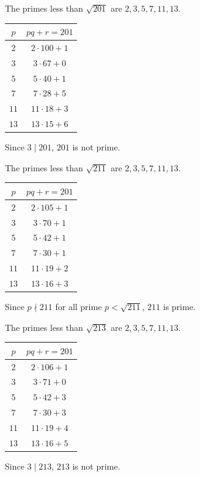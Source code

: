 \documentclass{article}
\begin{document}
\clearpage
\problem{}
The primes less than $\sqrt{201}$ are $2, 3, 5, 7, 11, 13$.
\begin{center}
    \begin{tabular}{|c|c|}
        \hline
        $p$ & $pq + r = 201$ \\
        \hline
        $2$ & $2 \cdot 100 + 1$ \\
        \hline
        $3$ & $3 \cdot 67 + 0$ \\
        \hline
        $5$ & $5 \cdot 40 + 1$ \\
        \hline
        $7$ & $7 \cdot 28 + 5$ \\
        \hline
        $11$ & $11 \cdot 18 + 3$ \\
        \hline
        $13$ & $13 \cdot 15 + 6$ \\
        \hline
    \end{tabular}
\end{center}
Since $3 \mid 201$, $201$ is not prime.

The primes less than $\sqrt{211}$ are $2, 3, 5, 7, 11, 13$.
\begin{center}
    \begin{tabular}{|c|c|}
        \hline
        $p$ & $pq + r = 201$ \\
        \hline
        $2$ & $2 \cdot 105 + 1$ \\
        \hline
        $3$ & $3 \cdot 70 + 1$ \\
        \hline
        $5$ & $5 \cdot 42 + 1$ \\
        \hline
        $7$ & $7 \cdot 30 + 1$ \\
        \hline
        $11$ & $11 \cdot 19 + 2$ \\
        \hline
        $13$ & $13 \cdot 16 + 3$ \\
        \hline
    \end{tabular}
\end{center}
Since $p \nmid 211$ for all prime $p < \sqrt{211}$, $211$ is prime.

The primes less than $\sqrt{213}$ are $2, 3, 5, 7, 11, 13$.
\begin{center}
    \begin{tabular}{|c|c|}
        \hline
        $p$ & $pq + r = 201$ \\
        \hline
        $2$ & $2 \cdot 106 + 1$ \\
        \hline
        $3$ & $3 \cdot 71 + 0$ \\
        \hline
        $5$ & $5 \cdot 42 + 3$ \\
        \hline
        $7$ & $7 \cdot 30 + 3$ \\
        \hline
        $11$ & $11 \cdot 19 + 4$ \\
        \hline
        $13$ & $13 \cdot 16 + 5$ \\
        \hline
    \end{tabular}
\end{center}
Since $3 \mid 213$, $213$ is not prime.
\end{document}
